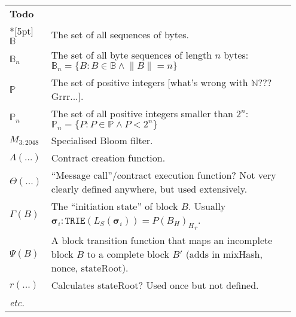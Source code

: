 \documentclass[9pt,oneside]{amsart}
\begin{document}
\begin{longtable}{p{0.10\linewidth}p{0.85\linewidth}}
\vspace{5pt} \\
\midrule
\multicolumn{2}{l}{\textbf{Todo}} \\*[5pt]
$\mathbb{B}$ & The set of all sequences of bytes. \\
$\mathbb{B}_n$ & The set of all byte sequences of length $n$ bytes: $\mathbb{B}_n = \{ B: B \in \mathbb{B} \wedge \lVert B \rVert = n \}$ \\
$\mathbb{P}$ & The set of positive integers [what's wrong with $\mathbb{N}$??? Grrr...]. \\
$\mathbb{P}_n$ & The set of all positive integers smaller than $2^n$: $\mathbb{P}_n = \{ P: P \in \mathbb{P} \wedge P < 2^n \}$ \\
$M_{3:2048}$ & Specialised Bloom filter. \\
$\Lambda(...)$ & Contract creation function. \\
$\Theta(...)$ & ``Message call''/contract execution function? Not very clearly defined anywhere, but used extensively. \\
$\Gamma(B)$ & The ``initiation state'' of block $B$. Usually $\boldsymbol{\sigma}_i: \mathtt{TRIE}(L_S(\boldsymbol{\sigma}_i)) = {P(B_H)_H}_r$. \\
$\Psi(B)$ & A block transition function that maps an incomplete block $B$ to a complete block $B'$ (adds in mixHash, nonce, stateRoot). \\
$r(...)$ & Calculates stateRoot? Used once but not defined. \\
\textit{etc.} \\

\bottomrule
\end{longtable}
\end{document}
